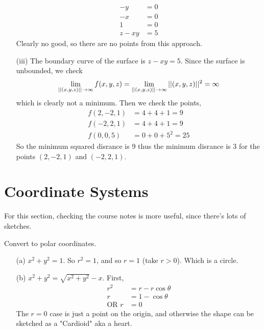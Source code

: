 \documentclass[english, 11pt]{article}
\begin{document}
\begin{exmp}
\begin{itemize}
\begin{align*}
      -y & = 0 \\
      -x & = 0 \\
      1 & = 0 \\
      z - xy & = 5
    \end{align*}
    Clearly no good, so there are no points from this approach.
    \item[(iii)] The boundary curve of the surface is $z - xy = 5$. Since the surface is unbounded, we check
    \[ \lim_{||(x,y,z)|| \rightarrow \infty} f(x,y,z) =  \lim_{||(x,y,z)|| \rightarrow \infty}  ||(x,y,z)||^2 = \infty \]
    which is clearly not a minimum. Then we check the points,
    \begin{align*}
      f(2,-2,1) & = 4 + 4 + 1 = 9 \\
      f(-2,2,1) & = 4 + 4 + 1 = 9 \\
      f(0,0,5) & = 0 + 0 + 5^2 = 25
    \end{align*}
    So the minimum squared disrance is 9 thus the minimum disrance is 3 for the points $(2,-2,1)$ and $(-2,2,1)$.
  \end{itemize}
\end{exmp}

\section{Coordinate Systems}

\begin{note}
  For this section, checking the course notes is more useful, since there's lots of sketches.
\end{note}

\begin{exmp}
  Convert to polar coordinates.
  \begin{itemize}
    \item[(a)] $x^2 + y^2 = 1$. So $r^2 = 1$, and so $r = 1$ (take $r > 0$). Which is a circle.
    \item[(b)] $x^2 + y^2 = \sqrt{x^2 + y^2} - x$. First,
    \begin{align*}
      r^2 & = r - r\cos \theta \\
      r & = 1 - \cos \theta \\
      \mbox{OR \ \ } r & = 0
    \end{align*}
    The $r = 0$ case is just a point on the origin, and otherwise the shape can be sketched as a "Cardioid" aka a heart.
  \end{itemize}
\end{exmp}
\end{document}
